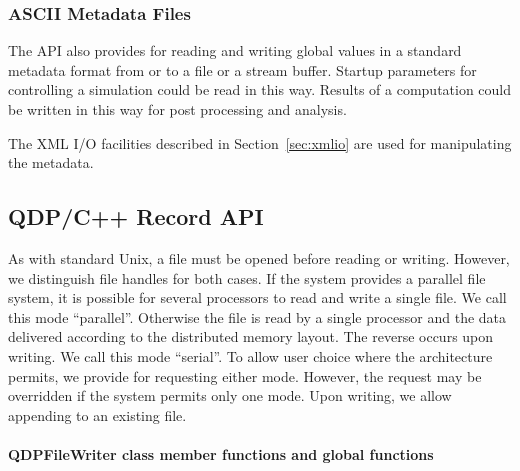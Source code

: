 \documentclass[12pt,letterpaper]{article}
\begin{document}
\subsubsection{ASCII Metadata Files}

The API also provides for reading and writing global values in a
standard metadata format from or to a file or a stream buffer.
Startup parameters for controlling a simulation could be read in this
way.  Results of a computation could be written in this way for post
processing and analysis.

The XML I/O facilities described in Section~\ref{sec:xmlio} are used
for manipulating the metadata.

\subsection{QDP/C++ Record API}

As with standard Unix, a file must be opened before reading or
writing.  However, we distinguish file handles for both cases.  If the
system provides a parallel file system, it is possible for several
processors to read and write a single file. We call this mode
``parallel''.  Otherwise the file is read by a single processor and
the data delivered according to the distributed memory layout.  The
reverse occurs upon writing. We call this mode ``serial''. To allow
user choice where the architecture permits, we provide for requesting
either mode.  However, the request may be overridden if the system
permits only one mode.  Upon writing, we allow appending to an
existing file.

\paragraph{QDPFileWriter class member functions and global functions}
\end{document}
